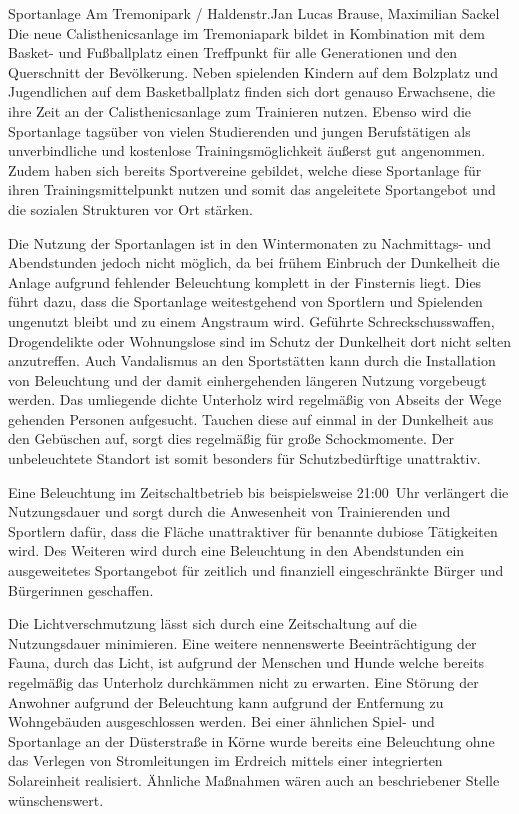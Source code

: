 \documentclass{../../templates/amendment}
\date{29. Dezember 2024}
\begin{document}
\begin{boxed}{Sportanlage Am Tremonipark / Haldenstr.}{Jan Lucas Brause, Maximilian Sackel}
    Die neue Calisthenicsanlage im Tremoniapark bildet in Kombination mit dem Basket- und Fußballplatz einen Treffpunkt für alle Generationen und den Querschnitt der Bevölkerung.
    Neben spielenden Kindern auf dem Bolzplatz und Jugendlichen auf dem Basketballplatz finden sich dort genauso Erwachsene, die ihre Zeit an der Calisthenicsanlage zum Trainieren nutzen.
    Ebenso wird die Sportanlage tagsüber von vielen Studierenden und jungen Berufstätigen als unverbindliche und kostenlose Trainingsmöglichkeit äußerst gut angenommen.
    Zudem haben sich bereits Sportvereine gebildet, welche diese Sportanlage für ihren Trainingsmittelpunkt nutzen und somit das angeleitete Sportangebot und die sozialen Strukturen vor Ort stärken.

    Die Nutzung der Sportanlagen ist in den Wintermonaten zu Nachmittags- und Abendstunden jedoch nicht möglich, da bei frühem Einbruch der Dunkelheit die Anlage aufgrund fehlender Beleuchtung komplett in der Finsternis liegt.
    Dies führt dazu, dass die Sportanlage weitestgehend von Sportlern und Spielenden ungenutzt bleibt und zu einem Angstraum wird.
    Geführte Schreckschusswaffen, Drogendelikte oder Wohnungslose sind im Schutz der Dunkelheit dort nicht selten anzutreffen.
    Auch Vandalismus an den Sportstätten kann durch die Installation von Beleuchtung und der damit einhergehenden längeren Nutzung vorgebeugt werden.
    Das umliegende dichte Unterholz wird regelmäßig von Abseits der Wege gehenden Personen aufgesucht.
    Tauchen diese auf einmal in der Dunkelheit aus den Gebüschen auf, sorgt dies regelmäßig für große Schockmomente.
    Der unbeleuchtete Standort ist somit besonders für Schutzbedürftige unattraktiv.

    Eine Beleuchtung im Zeitschaltbetrieb bis beispielsweise 21:00~Uhr verlängert die Nutzungsdauer und sorgt durch die Anwesenheit von
    Trainierenden und Sportlern dafür, dass die Fläche unattraktiver für benannte dubiose Tätigkeiten wird.
    Des Weiteren wird durch eine Beleuchtung in den Abendstunden ein ausgeweitetes Sportangebot für zeitlich und finanziell eingeschränkte Bürger und Bürgerinnen geschaffen.

    Die Lichtverschmutzung lässt sich durch eine Zeitschaltung auf die Nutzungsdauer minimieren.
    Eine weitere nennenswerte Beeinträchtigung der Fauna, durch das Licht, ist aufgrund der Menschen und Hunde welche bereits regelmäßig das Unterholz durchkämmen nicht zu erwarten.
    Eine Störung der Anwohner aufgrund der Beleuchtung kann aufgrund der Entfernung zu Wohngebäuden ausgeschlossen werden.
    Bei einer ähnlichen Spiel- und Sportanlage an der Düsterstraße in Körne wurde bereits eine Beleuchtung ohne das Verlegen von Stromleitungen im Erdreich mittels einer integrierten Solareinheit realisiert.
    Ähnliche Maßnahmen wären auch an beschriebener Stelle wünschenswert.


\end{boxed}
\end{document}
